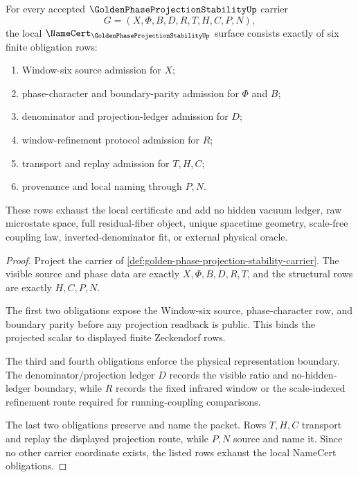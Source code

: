 \begin{theorem}
\label{thm:golden-phase-projection-stability-namecert-obligations}
For every accepted $\GoldenPhaseProjectionStabilityUp$ carrier
$$
G=(X,\Phi,B,D,R,T,H,C,P,N),
$$
the local $\NameCert_{\GoldenPhaseProjectionStabilityUp}$ surface consists exactly of six finite obligation rows:
\begin{enumerate}
\item Window-six source admission for $X$;
\item phase-character and boundary-parity admission for $\Phi$ and $B$;
\item denominator and projection-ledger admission for $D$;
\item window-refinement protocol admission for $R$;
\item transport and replay admission for $T,H,C$;
\item provenance and local naming through $P,N$.
\end{enumerate}
These rows exhaust the local certificate and add no hidden vacuum ledger, raw microstate space, full residual-fiber object, unique spacetime geometry, scale-free coupling law, inverted-denominator fit, or external physical oracle.
\end{theorem}
\begin{proof}
Project the carrier of \autoref{def:golden-phase-projection-stability-carrier}. The visible source and phase data are exactly $X,\Phi,B,D,R,T$, and the structural rows are exactly $H,C,P,N$.

The first two obligations expose the Window-six source, phase-character row, and boundary parity before any projection readback is public. This binds the projected scalar to displayed finite Zeckendorf rows.

The third and fourth obligations enforce the physical representation boundary. The denominator/projection ledger $D$ records the visible ratio and no-hidden-ledger boundary, while $R$ records the fixed infrared window or the scale-indexed refinement route required for running-coupling comparisons.

The last two obligations preserve and name the packet. Rows $T,H,C$ transport and replay the displayed projection route, while $P,N$ source and name it. Since no other carrier coordinate exists, the listed rows exhaust the local NameCert obligations.
\end{proof}

